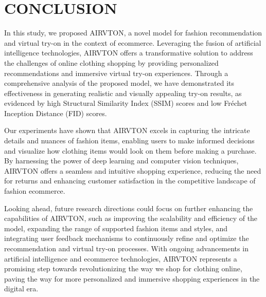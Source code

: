 \chapter[Conclusion]{CONCLUSION}

In this study, we proposed AIRVTON, a novel model for fashion recommendation and virtual try-on in the context of ecommerce. Leveraging the fusion of artificial intelligence technologies, AIRVTON offers a transformative solution to address the challenges of online clothing shopping by providing personalized recommendations and immersive virtual try-on experiences. Through a comprehensive analysis of the proposed model, we have demonstrated its effectiveness in generating realistic and visually appealing try-on results, as evidenced by high Structural Similarity Index (SSIM) scores and low Fréchet Inception Distance (FID) scores.

Our experiments have shown that AIRVTON excels in capturing the intricate details and nuances of fashion items, enabling users to make informed decisions and visualize how clothing items would look on them before making a purchase. By harnessing the power of deep learning and computer vision techniques, AIRVTON offers a seamless and intuitive shopping experience, reducing the need for returns and enhancing customer satisfaction in the competitive landscape of fashion ecommerce.

Looking ahead, future research directions could focus on further enhancing the capabilities of AIRVTON, such as improving the scalability and efficiency of the model, expanding the range of supported fashion items and styles, and integrating user feedback mechanisms to continuously refine and optimize the recommendation and virtual try-on processes. With ongoing advancements in artificial intelligence and ecommerce technologies, AIRVTON represents a promising step towards revolutionizing the way we shop for clothing online, paving the way for more personalized and immersive shopping experiences in the digital era.
